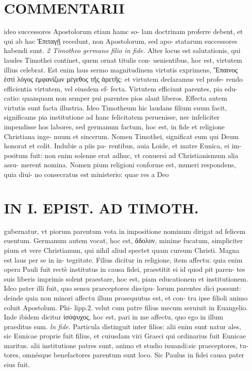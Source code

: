 \documentclass{article}
\begin{document}
\begin{pages}
\section*{COMMENTARII }
\marginpar{[ p.12 ]}\pstart ideo successores Apostolorum etiam hamc so- lam doctrinam proferre debent, et qui ab hac Ἐπιταγῇ  recedunt, non Apostolorum, sed apo- statarum successores habendi sunt.  \pend
\textit{2 Timotheo germano filio in fide. }\pstart Alter locus est salutationis, qui laudes Timothei continet, quem ornat titulis con- uenientibus, hoc est, virtutem illius celebrat. Est enim laus sermo magnitudinem virtutis exprimens, Ἔπαινος ἐστὶ λόγος ἐμφανίζων μέγεθος τῆς ἀρετῆς: et virtutem declaramus vel profe- rendo efficientia virtutem, vel eiusdem ef- fecta. Virtutem efficiunt parentes, pia edu- catio: quanquam non semper pui parentes pios alant liberos. Effecta autem virtutis sunt facta illustria. Ideo Timotheum hic laudans filium suum facit, significams pia institutione ad hanc felicitatem peruenisse, nec infeliciter impendisse hos labores, sed germanum factum, hoc est, in fide et religione Christiana inge- nuum et sincerum.  \pend\pstart Nomen Timothei, significat eum qui Deum honorat et colit. Indubie a piis pa- rentibus, auia Loide, et matre Eunica, ei im- positum fuit: non enim solenne erat adhuc, vt conuersi ad Christianismum alia assu- merent nomina. Nomen pium religioni conforme est, muneri respondens, quia diui- no consecratus est ministerio: quae res a Deo  \pend
\section*{IN I. EPIST. AD TIMOTH. }
\marginpar{[ p.13 ]}\pstart gubernatur, vt piorum parentum vota in impositione nominum dirigat ad felicem euentum.  \pend\pstart Germanum autem vocat, hoc est, ἄδολον, minime fucatum, simpliciter pium et vere Christianum, qui nihil aliud spectet quam cursum Christi. Magna est laus per se in in- tegritate.  \pend\pstart Filius dicitur in religione, item affectu: quia enim opera Pauli fuit rectè institutus in causa fidei, praestitit ei id quod pit paren- tes suis liberis imprimis solent praestare, hoc est, piam educationem et institutionem. Ideo pater illi fuit, quo sensu praeceptores discipu- lorum parentes dici possunt: deinde quia non minori affectu illum prosequutus est, et con- tra ipse filioli animo coluit Apostolum. Phi- lipp.2. velut cum patre filius mecum seruiuit in Euangelio. Inde ibidem dicitur ἰσόψυχος, hoc est, pari in me affectu, quo ego in illum praeditus sum.  \pend
\textit{ln fide. }\pstart Particula distinguit inter filios: alii enim sunt natur ales, sic Eunicae proprie fuit filius, et cuiusdam viri Graeci qui ordinarius fuit Eunicae maritus. alii institutione patres sunt, animo et studio iuuandi:sic praeceptores, tu- tores, omnésque benefactores parentum sunt loco. Sic Paulus in fidei causa pater eius fuit.  \pend
\marginpar{[ p.14 ]}

\end{pages}
\end{document}
